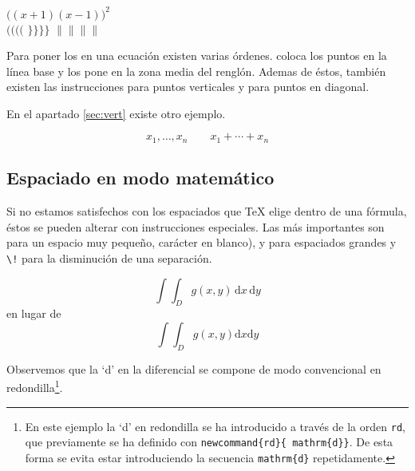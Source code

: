 \begin{example}
$\Big( (x+1) (x-1) \Big) ^{2}$\\
$\big(\Big(\bigg(\Bigg($\quad
$\big\}\Big\}\bigg\}\Bigg\}$\quad
$\big\|\Big\|\bigg\|\Bigg\|$
\end{example}

Para  poner  los  \textbf{}  en  una  ecuación
existen varias órdenes.  coloca  los puntos en la línea base
y  los  pone en la zona media del  renglón. Ademas de éstos,
también existen las instrucciones   para puntos verticales y
 para puntos en diagonal.

%
%
%
En el apartado \ref{sec:vert} existe otro ejemplo.

\begin{example}
\begin{displaymath}
x_{1},\ldots,x_{n} \qquad
x_{1}+\cdots+x_{n}
\end{displaymath}
\end{example}
 
\subsection{Espaciado en modo matemático}

 Si  no estamos satisfechos  con los espaciados  que \TeX{}
elige dentro de una fórmula, éstos se pueden alterar con instrucciones
especiales.  Las  más  importantes  son \ci{,}  para  un  espacio  muy
pequeño,  %
carácter en blanco),  y   para espaciados grandes y
\verb|\!| para la disminución de una separación.

\begin{example}
\newcommand{\rd}{\mathrm{d}}
\begin{displaymath}
\int\!\!\!\int_{D} g(x,y)
  \, \rd x\, \rd y
\end{displaymath}
en lugar de
\begin{displaymath}
\int\int_{D} g(x,y)\rd x \rd y
\end{displaymath}
\end{example}

Observemos  que  la  `d'{}  en  la  diferencial  se  compone  de  modo
convencional  en   redondilla\footnote{En  este  ejemplo  la   `d'  en
redondilla se ha introducido a través de la orden \texttt{\bs rd}, que
previamente se  ha definido con \texttt{\bs  newcommand\{\bs rd\}\{\bs
mathrm\{d\}\}}.  De  esta  forma   se  evita  estar  introduciendo  la
secuencia \texttt{\bs mathrm\{d\}} repetidamente.}.


